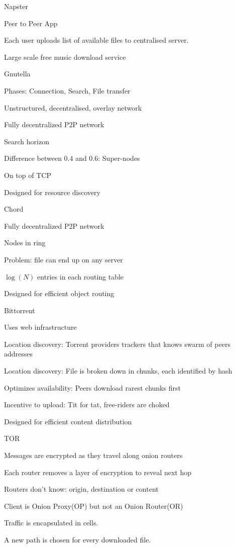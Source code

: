 \documentclass[main.tex]{subfiles}
\begin{document}
\begin{card}{Napster}
\item Peer to Peer App
\item Each user uploads list of available files to centralised server.
\item Large scale free music download service
\end{card}


\begin{card}{Gnutella}
\item Phases: Connection, Search, File transfer
\item Unstructured, decentralised, overlay network
\item Fully decentralized P2P network
\item Search horizon
\item Difference between 0.4 and 0.6: Super-nodes
\item On top of TCP
\item Designed for resource discovery
\end{card}

\begin{card}{Chord}
\item Fully decentralized P2P network
\item Nodes in ring
\item Problem: file can end up on any server
\item $\log(N)$ entries in each routing table
\item Designed for efficient object routing
\end{card}

\begin{card}{Bittorrent}
\item Uses web infrastructure
\item Location discovery: Torrent providers trackers that knows swarm of peers addresses
\item Location discovery: File is broken down in chunks, each identified by hash
\item Optimizes availability: Peers download rarest chunks first
\item Incentive to upload: Tit for tat, free-riders are choked
\item Designed for efficient content distribution
\end{card}

\begin{card}{TOR}
\item Messages are encrypted as they travel along onion routers
\item Each router removes a layer of encryption to reveal next hop
\item Routers don't know: origin, destination or content
\item Client is Onion Proxy(OP) but not an Onion Router(OR)
\item Traffic is encapsulated in cells.
\item A new path is chosen for every downloaded file.
\end{card}
\end{document}
